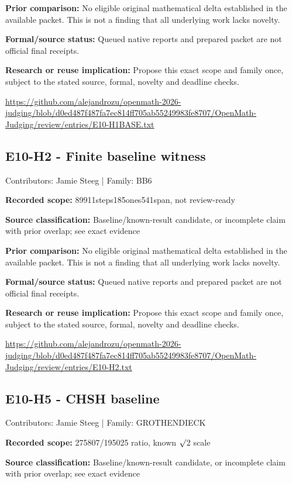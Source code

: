 \documentclass[11pt,a4paper]{article}
\begin{document}
\textbf{Prior comparison:} No eligible original mathematical delta established in the available packet. This is not a finding that all underlying work lacks novelty.

\textbf{Formal/source status:} Queued native reports and prepared packet are not official final receipts.

\textbf{Research or reuse implication:} Propose this exact scope and family once, subject to the stated source, formal, novelty and deadline checks.

{\small \url{https://github.com/alejandrozu/openmath-2026-judging/blob/d0ed487f487fa7ec814ff705ab55249983fe8707/OpenMath-Judging/review/entries/E10-H1BASE.txt}\par}

\begin{samepage}
\subsection{E10-H2  -  Finite baseline witness}
{\small Contributors: Jamie Steeg | Family: BB6\par}

\textbf{Recorded scope:} 89911steps185ones541span, not review-ready

\end{samepage}
\textbf{Source classification:} Baseline/known-result candidate, or incomplete claim with prior overlap; see exact evidence

\textbf{Prior comparison:} No eligible original mathematical delta established in the available packet. This is not a finding that all underlying work lacks novelty.

\textbf{Formal/source status:} Queued native reports and prepared packet are not official final receipts.

\textbf{Research or reuse implication:} Propose this exact scope and family once, subject to the stated source, formal, novelty and deadline checks.

{\small \url{https://github.com/alejandrozu/openmath-2026-judging/blob/d0ed487f487fa7ec814ff705ab55249983fe8707/OpenMath-Judging/review/entries/E10-H2.txt}\par}

\begin{samepage}
\subsection{E10-H5  -  CHSH baseline}
{\small Contributors: Jamie Steeg | Family: GROTHENDIECK\par}

\textbf{Recorded scope:} 275807/195025 ratio, known \ensuremath{\surd}2 scale

\end{samepage}
\textbf{Source classification:} Baseline/known-result candidate, or incomplete claim with prior overlap; see exact evidence
\end{document}
